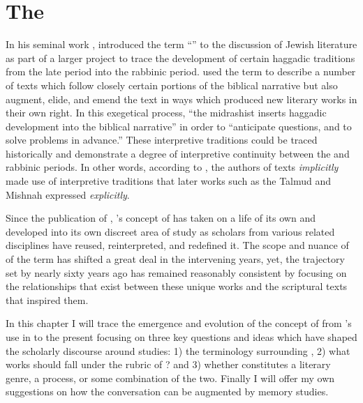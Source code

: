 
\hypertarget{the-rwb}{%
\chapter{The \RwB}\label{the-rwb}} 

 In his seminal work , \Vermes introduced the term ``\rwB'' to the discussion of \secondtemple Jewish literature as part of a larger project to trace the development of certain haggadic traditions from the late \secondtemple period into the rabbinic period. \vermes used the term \rwB to describe a number of texts which follow closely certain portions of the biblical narrative but also augment, elide, and emend the text in ways which produced new literary works in their own right. In this exegetical process, ``the midrashist inserts haggadic development into the biblical narrative'' in order to ``anticipate questions, and to solve problems in advance.''\autocites[95]{vermes1961}[see also][]{vermes_zsengeller2014} These interpretive traditions could be traced historically and demonstrate a degree of interpretive continuity between the \secondtemple and rabbinic periods. In other words, according to \vermes, the authors of \rwB texts \emph{implicitly} made use of interpretive traditions that later works such as the Talmud and Mishnah expressed \emph{explicitly}. 

 Since the publication of , \vermes's concept of \rwB has taken on a life of its own and developed into its own discreet area of study as scholars from various related disciplines have reused, reinterpreted, and redefined it. The scope and nuance of of the term \rwB has shifted a great deal in the intervening years, yet, the trajectory set by \vermes nearly sixty years ago has remained reasonably consistent by focusing on the relationships that exist between these unique works and the scriptural texts that inspired them. 

 In this chapter I will trace the emergence and evolution of the concept of \rwB from \vermes's use in  to the present focusing on three key questions and ideas which have shaped the scholarly discourse around \rwB studies: 1) the terminology surrounding \rwB, 2) what works should fall under the rubric of \rwB? and 3) whether \rwB constitutes a literary genre, a process, or some combination of the two. Finally I will offer my own suggestions on how the \rwb conversation can be augmented by memory studies. 

